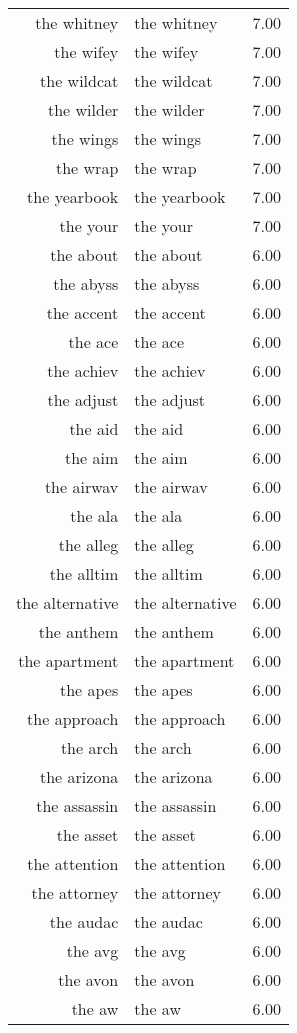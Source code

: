 \begin{table}[ht]
\begin{tabular}{rlr}
  the whitney & the whitney & 7.00 \\ 
  the wifey & the wifey & 7.00 \\ 
  the wildcat & the wildcat & 7.00 \\ 
  the wilder & the wilder & 7.00 \\ 
  the wings & the wings & 7.00 \\ 
  the wrap & the wrap & 7.00 \\ 
  the yearbook & the yearbook & 7.00 \\ 
  the your & the your & 7.00 \\ 
  the about & the about & 6.00 \\ 
  the abyss & the abyss & 6.00 \\ 
  the accent & the accent & 6.00 \\ 
  the ace & the ace & 6.00 \\ 
  the achiev & the achiev & 6.00 \\ 
  the adjust & the adjust & 6.00 \\ 
  the aid & the aid & 6.00 \\ 
  the aim & the aim & 6.00 \\ 
  the airwav & the airwav & 6.00 \\ 
  the ala & the ala & 6.00 \\ 
  the alleg & the alleg & 6.00 \\ 
  the alltim & the alltim & 6.00 \\ 
  the alternative & the alternative & 6.00 \\ 
  the anthem & the anthem & 6.00 \\ 
  the apartment & the apartment & 6.00 \\ 
  the apes & the apes & 6.00 \\ 
  the approach & the approach & 6.00 \\ 
  the arch & the arch & 6.00 \\ 
  the arizona & the arizona & 6.00 \\ 
  the assassin & the assassin & 6.00 \\ 
  the asset & the asset & 6.00 \\ 
  the attention & the attention & 6.00 \\ 
  the attorney & the attorney & 6.00 \\ 
  the audac & the audac & 6.00 \\ 
  the avg & the avg & 6.00 \\ 
  the avon & the avon & 6.00 \\ 
  the aw & the aw & 6.00 \\ 

\end{tabular}
\end{table}
